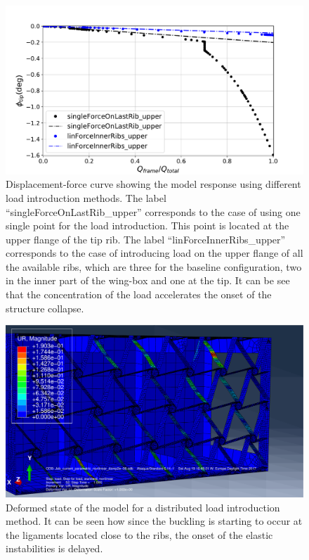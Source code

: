     \begin{figure}[!htpb]
      \centering
      \includegraphics[width=0.8 \textwidth]{../figures/result-model/forceDisplacement-distributedLoad700N}
      \caption[Displacement-force curve showing the model response using different load introduction methods]{Displacement-force curve showing the model response using different load introduction methods. The label ``singleForceOnLastRib\_upper'' corresponds to the case of using one single point for the load introduction. This point is located at the upper flange of the tip rib. The label ``linForceInnerRibs\_upper'' corresponds to the case of introducing load on the upper flange of all the available ribs, which are three for the baseline configuration, two in the inner part of the wing-box and one at the tip. It can be see that the concentration of the load accelerates the onset of the structure collapse.}
      \label{fig:forceDisplacement-distributedLoad700N}
    \end{figure}

    \begin{figure}[!htpb]
      \centering
      \includegraphics[width=0.8 \textwidth]{../figures/result-model/distributedLoad700N}
      \caption[Deformed state of the model for a distributed load introduction method]{Deformed state of the model for a distributed load introduction method. It can be seen how since the buckling is starting to occur at the ligaments located close to the ribs, the onset of the elastic instabilities is delayed.}
      \label{fig:distributedLoad700N}
    \end{figure}

